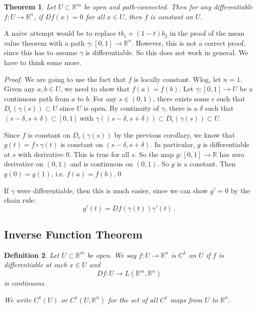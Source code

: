 \documentclass{article}
\theoremstyle{plain}\theoremheaderfont{\normalfont\itshape}\theorembodyfont{\rmfamily}\theoremseparator{.}\newtheorem*{rem}{Remark}\newtheorem*{ex}{Example}\newtheorem*{proof}{Proof}\newtheorem*{altp}{Alternative proof}
\theoremstyle{plain}\theoremheaderfont{\normalfont\bfseries}\theorembodyfont{\rmfamily}\theoremseparator{.}\newtheorem{thm}{Theorem}[section]\newtheorem{lem}[thm]{Lemma}\newtheorem{prop}[thm]{Proposition}\newtheorem*{cor}{Corollary}\newtheorem{defn}[thm]{Definition}\newtheorem{clm}[thm]{Claim}\newtheorem{clminproof}{Claim}
\theoremstyle{break}\theoremheaderfont{\normalfont\itshape}\theorembodyfont{\rmfamily}\theoremseparator{.\medskip}\newtheorem*{proofskip}{Proof}\newtheorem*{exs}{Examples}\newtheorem*{rems}{Remarks}
\theoremstyle{break}\theoremheaderfont{\normalfont\bfseries}\theorembodyfont{\rmfamily}\theoremseparator{.\medskip}\newtheorem{lemskip}[thm]{Lemma}\newtheorem{defnskip}[thm]{Definition}\newtheorem{propskip}[thm]{Proposition}\newtheorem{thmskip}[thm]{Theorem}
\newcommand{\qed}{\hfill\ensuremath{\Box}}
\begin{document}
    \begin{thm}
        Let \(U\subset\mathbb{R}^m\) be open and path-connected. Then for any differentiable \(f:U\to\mathbb{R}^n\), if \(Df(x)=0\) for all \(x\in U\), then \(f\) is constant on \(U\).
    \end{thm}

    A naive attempt would be to replace \(tb_1+(1-t)b_2\) in the proof of the mean value theorem with a path \(\gamma:[0,1]\to\mathbb{R}^n\). However, this is not a correct proof, since this has to assume \(\gamma\) is differentiable. So this does not work in general. We have to think some more.

    \begin{proof}
        We are going to use the fact that \(f\) is locally constant. Wlog, let \(n=1\). Given any \(a,b\in U\), we need to show that \(f(a)=f(b)\). Let \(\gamma:[0,1]\to U\) be a continuous path from \(a\) to \(b\). For any \(s\in(0,1)\), there exists some \(\epsilon\) such that \(D_\epsilon(\gamma(s))\subset U\) since \(U\) is open. By continuity of \(\gamma\), there is a \(\delta\) such that \((s-\delta,s+\delta)\subset[0,1]\) with \(\gamma((s-\delta,s+\delta))\subset D_\epsilon(\gamma(s))\subset U\).

        Since \(f\) is constant on \(D_\epsilon(\gamma(s))\) by the previous corollary, we know that \(g(t)=f\circ\gamma(t)\) is constant on \((s-\delta,s+\delta)\). In particular, \(g\) is differentiable at \(s\) with derivative \(0\). This is true for all \(s\). So the map \(g:[0,1]\to\mathbb{R}\) has zero derivative on \((0,1)\) and is continuous on \((0,1)\). So \(g\) is a constant. Then \(g(0)=g(1)\), i.e. \(f(a)=f(b)\).\qed
    \end{proof}
    If \(\gamma\) were differentiable, then this is much easier, since we can show \(g'=0\) by the chain rule:
    \[g'(t)=Df(\gamma(t))\gamma'(t)\,.\]

    \subsection{Inverse Function Theorem}
    \begin{defn}
        Let \(U\subset\mathbb{R}^m\) be open. We say \(f:U\to\mathbb{R}^n\) is \(C^1\) on \(U\) if \(f\) is differentiable at each \(x\in U\) and
        \[Df:U\to L(\mathbb{R}^m,\mathbb{R}^n)\]
        is continuous.

        We write \(C^1(U)\) or \(C^1(U;\mathbb{R}^n)\) for the set of all \(C^1\) maps from \(U\) to \(\mathbb{R}^n\).
    \end{defn}
\end{document}
